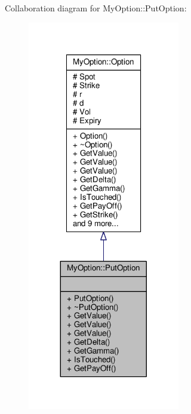 Collaboration diagram for My\+Option\+:\+:Put\+Option\+:
\nopagebreak
\begin{figure}[H]
\begin{center}
\leavevmode
\includegraphics[width=188pt]{classMyOption_1_1PutOption__coll__graph}
\end{center}
\end{figure}
